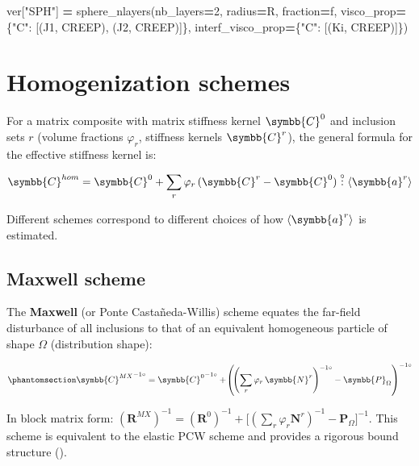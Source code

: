 \documentclass[
  a4paper,
  numbers=noendperiod,
  DIV=12]{scrreprt}
\newenvironment{Shaded}{\begin{snugshade}}{\end{snugshade}}
\newcommand{\DecValTok}[1]{\textcolor[rgb]{0.00,0.00,0.81}{#1}}
\newcommand{\NormalTok}[1]{#1}
\newcommand{\OperatorTok}[1]{\textcolor[rgb]{0.81,0.36,0.00}{\textbf{#1}}}
\newcommand{\StringTok}[1]{\textcolor[rgb]{0.31,0.60,0.02}{#1}}
\newcommand{\uuuu}[1]{{\symbb{{#1}}}}
\newcommand{\volt}[1]{{#1}^{-1\circ}}
\newcommand{\dcirc}{\overset{\circ}{:}}
\begin{document}
\begin{Shaded}
\begin{Highlighting}[]
\NormalTok{ver[}\StringTok{"SPH"}\NormalTok{] }\OperatorTok{=}\NormalTok{ sphere\_nlayers(nb\_layers}\OperatorTok{=}\DecValTok{2}\NormalTok{, radius}\OperatorTok{=}\NormalTok{R, fraction}\OperatorTok{=}\NormalTok{f,}
\NormalTok{                             visco\_prop}\OperatorTok{=}\NormalTok{\{}\StringTok{"C"}\NormalTok{: [(J1, CREEP), (J2, CREEP)]\},}
\NormalTok{                             interf\_visco\_prop}\OperatorTok{=}\NormalTok{\{}\StringTok{"C"}\NormalTok{: [(Ki, CREEP)]\})}
\end{Highlighting}
\end{Shaded}

\section{Homogenization schemes}\label{sec-visco-schemes}

For a matrix composite with matrix stiffness kernel \(\uuuu{C}^0\) and
inclusion sets \(r\) (volume fractions \(\varphi_r\), stiffness kernels
\(\uuuu{C}^r\)), the general formula for the effective stiffness kernel
is:

\[
\uuuu{C}^{hom} = \uuuu{C}^0 + \sum_r \varphi_r\,(\uuuu{C}^r - \uuuu{C}^0) \dcirc \langle\uuuu{a}^r\rangle
\]

Different schemes correspond to different choices of how
\(\langle\uuuu{a}^r\rangle\) is estimated.

\subsection{Maxwell scheme}\label{maxwell-scheme}

The \textbf{Maxwell} (or Ponte Castañeda-Willis) scheme equates the
far-field disturbance of all inclusions to that of an equivalent
homogeneous particle of shape \(\Omega\) (distribution shape):

\begin{equation}\protect\phantomsection\label{eq-maxwell-alv}{
\volt{\uuuu{C}^{MX}} = \volt{\uuuu{C}^0} + \volt{\!\left(\volt{\!\left(\sum_r \varphi_r\,\uuuu{N}^r\right)} - \uuuu{P}_\Omega\right)}
}\end{equation}

In block matrix form:
\((\mathbf{R}^{MX})^{-1} = (\mathbf{R}^0)^{-1} + \bigl[(\sum_r\varphi_r\mathbf{N}^r)^{-1} - \mathbf{P}_\Omega\bigr]^{-1}\).
This scheme is equivalent to the elastic PCW scheme and provides a
rigorous bound structure ().
\end{document}
